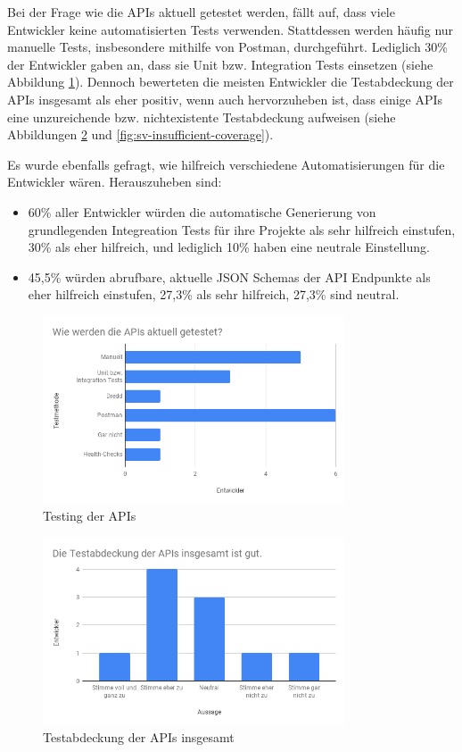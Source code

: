 Bei der Frage wie die APIs aktuell getestet werden, fällt auf, dass viele Entwickler keine automatisierten Tests verwenden. Stattdessen werden häufig nur manuelle Tests, insbesondere mithilfe von Postman, durchgeführt. Lediglich 30\% der Entwickler gaben an, dass sie Unit bzw. Integration Tests einsetzen (siehe Abbildung \ref{fig:sv-testing}). Dennoch bewerteten die meisten Entwickler die Testabdeckung der APIs insgesamt als eher positiv, wenn auch hervorzuheben ist, dass einige APIs eine unzureichende bzw. nichtexistente Testabdeckung aufweisen (siehe Abbildungen \ref{fig:sv-coverage} und \ref{fig:sv-insufficient-coverage}). 

Es wurde ebenfalls gefragt, wie hilfreich verschiedene Automatisierungen für die Entwickler wären. Herauszuheben sind: 

\begin{itemize}
	\item 60\% aller Entwickler würden die automatische Generierung von grundlegenden Integreation Tests für ihre Projekte als sehr hilfreich einstufen, 30\% als eher hilfreich, und lediglich 10\% haben eine neutrale Einstellung.
	\item 45,5\% würden abrufbare, aktuelle JSON Schemas der API Endpunkte als eher hilfreich einstufen, 27,3\% als sehr hilfreich, 27,3\% sind neutral.
\end{itemize} 

\begin{figure}[H]
\centering
  \includegraphics[width=0.8\textwidth]{../images/testing.png}
  \caption{Testing der APIs}
  \label{fig:sv-testing}
\end{figure}

\begin{figure}[H]
\centering
  \includegraphics[width=0.8\textwidth]{../images/coverage.png}
  \caption{Testabdeckung der APIs insgesamt}
  \label{fig:sv-coverage}
\end{figure}

